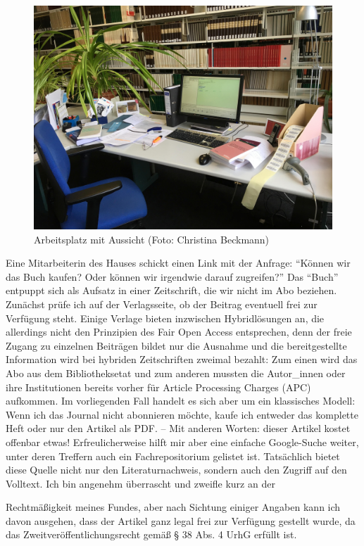 \documentclass[a4paper,
fontsize=11pt,
oneside,
numbers=noperiodatend,
parskip=half-,
bibliography=totoc,
final
]{scrartcl}
\begin{document}
\begin{figure}
\centering
\includegraphics{img/Beckmann_1.jpg}
\caption{Arbeitsplatz mit Aussicht (Foto: Christina Beckmann)}
\end{figure}

Eine Mitarbeiterin des Hauses schickt einen Link mit der Anfrage:
\enquote{Können wir das Buch kaufen? Oder können wir irgendwie darauf
zugreifen?} Das \enquote{Buch} entpuppt sich als Aufsatz in einer
Zeitschrift, die wir nicht im Abo beziehen. Zunächst prüfe ich auf der
Verlagsseite, ob der Beitrag eventuell frei zur Verfügung steht. Einige
Verlage bieten inzwischen Hybridlösungen an, die allerdings nicht den
Prinzipien des Fair Open Access entsprechen, denn der freie Zugang zu
einzelnen Beiträgen bildet nur die Ausnahme und die bereitgestellte
Information wird bei hybriden Zeitschriften zweimal bezahlt: Zum einen
wird das Abo aus dem Bibliotheksetat und zum anderen mussten die
Autor\_innen oder ihre Institutionen bereits vorher für Article
Processing Charges (APC) aufkommen. Im vorliegenden Fall handelt es sich
aber um ein klassisches Modell: Wenn ich das Journal nicht abonnieren
möchte, kaufe ich entweder das komplette Heft oder nur den Artikel als
PDF. -- Mit anderen Worten: dieser Artikel kostet offenbar etwas!
Erfreulicherweise hilft mir aber eine einfache Google-Suche weiter,
unter deren Treffern auch ein Fachrepositorium gelistet ist. Tatsächlich
bietet diese Quelle nicht nur den Literaturnachweis, sondern auch den
Zugriff auf den Volltext. Ich bin angenehm überrascht und zweifle kurz
an der

Rechtmäßigkeit meines Fundes, aber nach Sichtung einiger Angaben kann
ich davon ausgehen, dass der Artikel ganz legal frei zur Verfügung
gestellt wurde, da das Zweitveröffentlichungsrecht gemäß § 38 Abs. 4
UrhG erfüllt ist.
\end{document}
